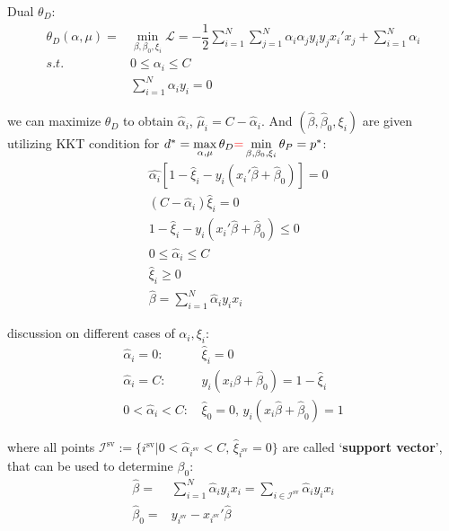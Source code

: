    Dual $ \theta _D $:
\begin{align}\label{EqaDualProblemOfSVM}
    \theta _D(\alpha,\mu )=&\mathop{\min}\limits_{\beta ,\beta _0,\xi _i} \mathcal{L}=-\dfrac{1}{2}\sum_{i=1}^N\sum_{j=1}^N\alpha _i\alpha _jy_iy_jx_i'x_j+\sum_{i=1}^N\alpha _i\\
    s.t.\quad&0\leq \alpha _i\leq C\\
    &\sum_{i=1}^N\alpha _iy_i=0
\end{align}

    we can maximize $ \theta _D $ to obtain $ \hat{\alpha }_i $, $ \hat{\mu }_i=C-\hat{\alpha }_i $. And $ (\hat{\beta },\hat{\beta }_0,\xi _i) $ are given utilizing KKT condition for $ d^*=\mathop{\max}\limits_{\alpha ,\mu } \theta _D{\color{red}=}\mathop{\min}\limits_{\beta ,\beta _0,\xi _i}\theta _P=p^*  $:
\begin{align}
    &\hat{\alpha _i}\left[1-\hat{\xi }_i-y_i(x_i'\hat{\beta }+\hat{\beta }_0)\right]=0\\
    &(C-\hat{\alpha }_i)\hat{\xi }_i=0\\
    &1-\hat{\xi }_i-y_i(x_i'\hat{\beta }+\hat{\beta }_0)\leq 0\\
    &0\leq \hat{\alpha }_i\leq C\\
    &\hat{\xi }_i\geq 0\\
    &\hat{\beta }=\sum_{i=1}^N\hat{\alpha }_iy_ix_i
\end{align}

    discussion on different cases of $ \alpha _i,\xi _i $:
\begin{align}
    \hat{\alpha }_i=0:\,    &\hat{\xi }_i=0\\
    \hat{\alpha }_i=C:\,    &y_i(x_i\hat{\beta }+\hat{\beta }_0)=1-\hat{\xi }_i\\
    0<\hat{\alpha }_i<C:\,  &\hat{\xi }_0=0,\, y_i(x_i\hat{\beta }+\hat{\beta }_0)=1
\end{align}

    where all points $ \mathcal{I}^\mathrm{sv}:=  \{i^\mathrm{sv} \big|0<\hat{ \alpha }_{i^{\mathrm{sv} }}<C,\,\hat{\xi }_{i^\mathrm{sv} }=0 \} $ are called `\textbf{support vector}', that can be used to determine $ \beta _0 $:
\begin{align}
    \hat{\beta }=&\sum_{i=1}^N\hat{\alpha }_iy_ix_i=\sum_{i\in\mathcal{I}^\mathrm{sv} }\hat{\alpha }_iy_ix_i\\
    \hat{\beta }_0=&y_{i^\mathrm{sv} }-x_{i^\mathrm{sv} }'\hat{\beta }
\end{align}
    
